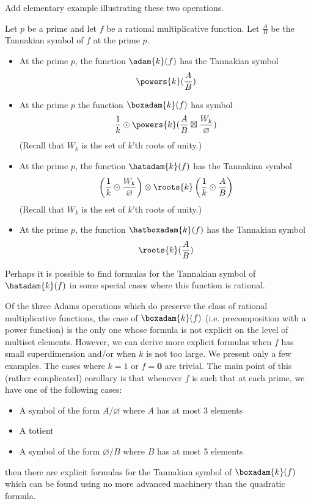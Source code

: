 \documentclass[a4paper]{article}
\begin{document}
\begin{example}
Add elementary example illustrating these two operations.
\end{example}

\begin{theorem}
Let $p$ be a prime and let $f$ be a rational multiplicative function. Let $\frac{A}{B}$ be the Tannakian symbol of $f$ at the prime $p$. 
\begin{itemize}
\item At the prime $p$, the function $\adam{k}(f)$ has the Tannakian symbol 
$$\powers{k}(\frac{A}{B})$$

\item At the prime $p$ the function $\boxadam{k}(f)$ has symbol 
$$\frac{1}{k} \odot \powers{k}(\frac{A}{B} \boxtimes \frac{W_k}{\varnothing})$$
(Recall that $W_k$ is the set of $k$'th roots of unity.) 
\item At the prime $p$, the function $\hatadam{k}(f)$ has the Tannakian symbol
$$\left(\frac{1}{k} \odot\frac{W_k}{\varnothing}\right) \otimes \roots{k}\left(\frac{1}{k} \odot \frac{A}{B}\right)
$$
(Recall that $W_k$ is the set of $k$'th roots of unity.) 
\item At the prime $p$, the function $\hatboxadam{k}(f)$ has the Tannakian symbol 
$$\roots{k}(\frac{A}{B})$$
\end{itemize}
\end{theorem}

\begin{remark}
Perhaps it is possible to find formulas for the Tannakian symbol of $\hatadam{k}(f)$ in some special cases where this function is rational. 
\end{remark}



Of the three Adams operations which do preserve the class of rational multiplicative functions, the case of $\boxadam{k}(f)$ (i.e. precomposition with a power function) is the only one whose formula is not explicit on the level of multiset elements. However, we can derive more explicit formulas when $f$ has small superdimension and/or when $k$ is not too large. We present only a few examples. The cases where $k=1$ or $f= \mathbf{0}$ are trivial. The main point of this (rather complicated) corollary is that whenever $f$ is such that at each prime, we have one of the following cases:
\begin{itemize}
\item A symbol of the form $A/ \varnothing$ where $A$ has at most 3 elements
\item A totient
\item A symbol of the form $\varnothing / B$ where $B$ has at most 5 elements
\end{itemize}
then there are explicit formulas for the Tannakian symbol of $\boxadam{k}(f)$ which can be found using no more advanced machinery than the quadratic formula.
\end{document}
